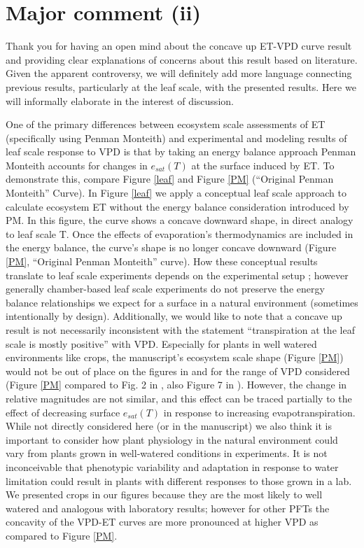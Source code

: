 \documentclass[12pt]{article}
\begin{document}
\section{Major comment (ii)}
\label{ii}
Thank you for having an open mind about the concave up ET-VPD curve
result and providing clear explanations of concerns about this result
based on literature. Given the apparent controversy, we will
definitely add more language connecting previous results, particularly
at the leaf scale, with the presented results. Here we will informally
elaborate in the interest of discussion.

One of the primary differences between ecosystem scale assessments of
ET (specifically using Penman Monteith) and experimental and modeling
results of leaf scale response to VPD is that by taking an energy
balance approach Penman Monteith accounts for changes in $e_{sat}(T)$
at the surface induced by ET. To demonstrate this, compare Figure
\ref{leaf} and Figure \ref{PM} (``Original Penman Monteith''
Curve). In Figure \ref{leaf} we apply a conceptual leaf scale
approach to calculate ecosystem ET without the energy balance
consideration introduced by PM. In this figure, the curve shows a
concave downward shape, in direct analogy to leaf scale T. Once the
effects of evaporation's thermodynamics are included in the energy
balance, the curve's shape is no longer concave downward (Figure
\ref{PM}, ``Original Penman Monteith'' curve). How these conceptual
results translate to leaf scale experiments depends on the
experimental setup \citep[e.g.,][]{Rawson1977, Turner1984, Mott2013};
however generally chamber-based leaf scale experiments do not preserve
the energy balance relationships we expect for a surface in a
natural environment (sometimes intentionally by design). Additionally,
we would like to note that a concave up result is not necessarily
inconsistent with the statement ``transpiration at the leaf scale is
mostly positive'' with VPD. Especially for plants in well watered
environments like crops, the manuscript's ecosystem scale shape
(Figure \ref{PM}) would not be out of place on the figures in
\cite{Rawson1977} and \cite{Mott2007} for the range of VPD considered
(Figure \ref{PM} compared to Fig. 2 in \cite{Rawson1977}, also
Figure 7 in \cite{Mott2007}). However, the change in relative
magnitudes are not similar, and this effect can be traced partially to
the effect of decreasing surface $e_{sat}(T)$ in response to
increasing evapotranspiration. While not directly considered here (or
in the manuscript) we also think it is important to consider how plant
physiology in the natural environment could vary from plants grown in
well-watered conditions in experiments. It is not inconceivable that
phenotypic variability and adaptation in response to water limitation
could result in plants with different responses to those grown in a
lab. We presented crops in our figures because they are the most likely
to well watered and analogous with laboratory results; however for
other PFTs the concavity of the VPD-ET curves are more pronounced at
higher VPD as compared to Figure \ref{PM}.
\end{document}
